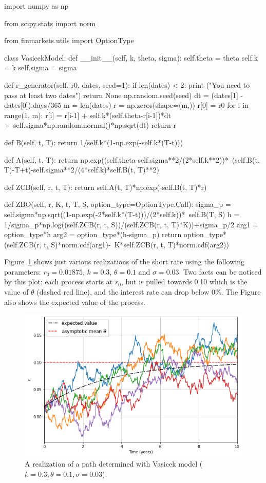 \begin{ipython}
import numpy as np

from scipy.stats import norm

from finmarkets.utils import OptionType

class VasicekModel:
    def __init__(self, k, theta, sigma):
        self.theta = theta
        self.k = k
        self.sigma = sigma
        
    def r_generator(self, r0, dates, seed=1):
        if len(dates) < 2:
            print ("You need to pass at least two dates")
            return None
        np.random.seed(seed)
        dt = (dates[1] - dates[0]).days/365
        m = len(dates)
        r = np.zeros(shape=(m,))
        r[0] = r0
        for i in range(1, m):
            r[i] = r[i-1] + self.k*(self.theta-r[i-1])*dt +\
                   self.sigma*np.random.normal()*np.sqrt(dt)
        return r
            
    def B(self, t, T):
        return 1/self.k*(1-np.exp(-self.k*(T-t)))

    def A(self, t, T):
        return np.exp((self.theta-self.sigma**2/(2*self.k**2))*\
               (self.B(t, T)-T+t)-self.sigma**2/(4*self.k)*self.B(t, T)**2)
    
    def ZCB(self, r, t, T):
        return self.A(t, T)*np.exp(-self.B(t, T)*r)

    def ZBO(self, r, K, t, T, S, option_type=OptionType.Call):
        sigma_p = self.sigma*np.sqrt((1-np.exp(-2*self.k*(T-t)))/(2*self.k))*\
                  self.B(T, S)
        h = 1/sigma_p*np.log((self.ZCB(r, t, S))/(self.ZCB(r, t, T)*K))+sigma_p/2
        arg1 = option_type*h
        arg2 = option_type*(h-sigma_p)
        return option_type*(self.ZCB(r, t, S)*norm.cdf(arg1)-\
               K*self.ZCB(r, t, T)*norm.cdf(arg2))\end{ipython}

Figure~\ref{fig:vasicek_path} shows just various realizations of the short rate using the following parameters: $r_0=0.01875$, $k=0.3$, $\theta=0.1$ and $\sigma=0.03$. 
Two facts can be noticed by this plot: each process starts at $r_0$, but is pulled towards 0.10 which is the value of $\theta$ (dashed red line), and the interest rate can drop below 0\%. The Figure also shows the expected value of the process.

\begin{figure}[htb]
  \centering
  \includegraphics[width=0.7\linewidth]{figures/vasicek_short_rate}
  \caption{A realization of a path determined with Vasicek model ($k=0.3, \theta=0.1, \sigma=0.03$).}
  \label{fig:vasicek_path}
\end{figure}

